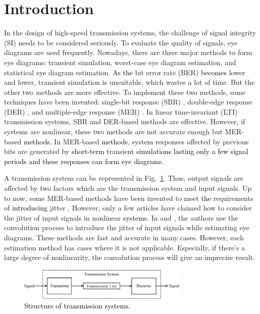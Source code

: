 \documentclass[conference]{IEEEtran}
\begin{document}
\section{Introduction}\label{I}

In the design of high-speed transmission systems, the challenge of signal integrity (SI) needs to be considered seriously. To evaluate the quality of signals, eye diagrams are used frequently. Nowadays, there are three major methods to form eye diagrams: transient simulation, worst-case eye diagram estimation, and statistical eye diagram estimation. As \textcolor{black}{the} bit error rate (BER) \textcolor{black}{becomes} lower and lower, transient simulation is unsuitable, which wastes a lot of time. But the other two methods are more effective. To implement these two methods, some techniques have been invented: single-bit response (SBR) \cite{b1}, double-edge response (DER) \cite{b2}, and multiple-edge response (MER) \cite{b3,b4}. In linear time-invariant (LTI) transmission systems, SBR and DER-based methods are effective. However, if systems are nonlinear, these two methods are not accurate enough but MER-based \textcolor{black}{methods}. In MER-based \textcolor{black}{methods}, system responses affected by previous bits are generated by \textcolor{black}{short-term} transient \textcolor{black}{simulations lasting only a few signal periods and these responses can form eye diagrams.}

A transmission system can be represented in Fig.~\ref{Fig1}. Thus, output signals are affected by two factors which are the transmission system and input signals. Up to now, some MER-based methods have been invented to meet \textcolor{black}{the} requirements of \textcolor{black}{introducing} jitter \cite{b5,b6,b7}. However, only a few articles have claimed how to consider the jitter of input signals in nonlinear \textcolor{black}{systems}.
\color{black}
In \cite{b4} and \cite{b8}, the authors use the convolution process to introduce the jitter of input signals while estimating eye diagrams. These methods are fast and accurate in many cases. However, each estimation method has cases where it is not applicable. Especially, if there's a large degree of nonlinearity, the convolution process will give an imprecise result.
\color{black}

\begin{figure}[t]
\centerline{\includegraphics[width=230pt]{Fig1.png}}
\caption{\textcolor{black}{Structure of transmission systems.}}
\label{Fig1}
\end{figure}
\end{document}
